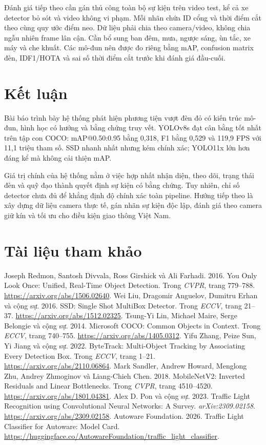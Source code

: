 \documentclass[11pt,a4paper]{article}
\makeatletter
\renewenvironment{thebibliography}[1]{%
  \section*{Tài liệu tham khảo}\phantomsection
  \addcontentsline{toc}{section}{Tài liệu tham khảo}\small
  \list{\@biblabel{\the\c@NAT@ctr}}{\@bibsetup{#1}\global\c@NAT@ctr\z@}%
  \let\p@NAT@ctr\@empty\renewcommand\theNAT@ctr{\arabic{NAT@ctr}}%
  \sloppy\clubpenalty4000\widowpenalty4000}{\endlist}
\makeatother
\begin{document}
Đánh giá tiếp theo cần gán thủ công toàn bộ sự kiện trên video test, kể cả xe detector bỏ sót và video không vi phạm. Mỗi nhãn chứa ID cổng và thời điểm cắt theo cùng quy ước điểm neo. Dữ liệu phải chia theo camera/video, không chia ngẫu nhiên frame lân cận. Cần bổ sung ban đêm, mưa, ngược sáng, ùn tắc, xe máy và che khuất. Các mô-đun nên được đo riêng bằng mAP, confusion matrix đèn, IDF1/HOTA và sai số thời điểm cắt trước khi đánh giá đầu-cuối.

\section{Kết luận}
Bài báo trình bày hệ thống phát hiện phương tiện vượt đèn đỏ có kiến trúc mô-đun, hình học có hướng và bằng chứng truy vết. YOLOv8s đạt cân bằng tốt nhất trên tập con COCO: mAP@0.50:0.95 bằng 0,318, F1 bằng 0,529 và 119,9 FPS với 11,1 triệu tham số. SSD nhanh nhất nhưng kém chính xác; YOLO11x lớn hơn đáng kể mà không cải thiện mAP.

Giá trị chính của hệ thống nằm ở việc hợp nhất nhận diện, theo dõi, trạng thái đèn và quỹ đạo thành quyết định sự kiện có bằng chứng. Tuy nhiên, chỉ số detector chưa đủ để khẳng định độ chính xác toàn pipeline. Hướng tiếp theo là xây dựng dữ liệu camera thực tế, gán nhãn sự kiện độc lập, đánh giá theo camera giữ kín và tối ưu cho điều kiện giao thông Việt Nam.

\begin{thebibliography}{9}
 Joseph Redmon, Santosh Divvala, Ross Girshick và Ali Farhadi. 2016. You Only Look Once: Unified, Real-Time Object Detection. Trong \textit{CVPR}, trang 779--788. \url{https://arxiv.org/abs/1506.02640}.
 Wei Liu, Dragomir Anguelov, Dumitru Erhan và cộng sự. 2016. SSD: Single Shot MultiBox Detector. Trong \textit{ECCV}, trang 21--37. \url{https://arxiv.org/abs/1512.02325}.
 Tsung-Yi Lin, Michael Maire, Serge Belongie và cộng sự. 2014. Microsoft COCO: Common Objects in Context. Trong \textit{ECCV}, trang 740--755. \url{https://arxiv.org/abs/1405.0312}.
 Yifu Zhang, Peize Sun, Yi Jiang và cộng sự. 2022. ByteTrack: Multi-Object Tracking by Associating Every Detection Box. Trong \textit{ECCV}, trang 1--21. \url{https://arxiv.org/abs/2110.06864}.
 Mark Sandler, Andrew Howard, Menglong Zhu, Andrey Zhmoginov và Liang-Chieh Chen. 2018. MobileNetV2: Inverted Residuals and Linear Bottlenecks. Trong \textit{CVPR}, trang 4510--4520. \url{https://arxiv.org/abs/1801.04381}.
 Alex D. Pon và cộng sự. 2023. Traffic Light Recognition using Convolutional Neural Networks: A Survey. \textit{arXiv:2309.02158}. \url{https://arxiv.org/abs/2309.02158}.
 Autoware Foundation. 2026. Traffic Light Classifier for Autoware: Model Card. \url{https://huggingface.co/AutowareFoundation/traffic_light_classifier}.
\end{thebibliography}
\end{document}
